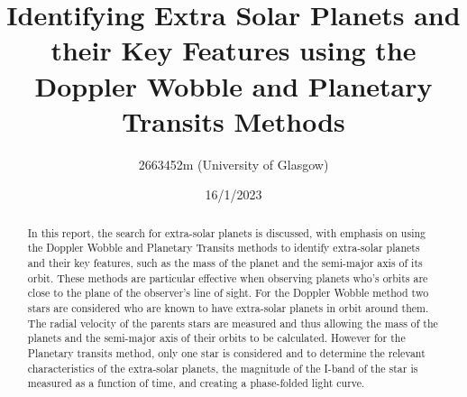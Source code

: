 \documentclass[]{article}
\title{\textbf{Identifying Extra Solar Planets and their Key Features using 
the Doppler Wobble and Planetary Transits Methods}}
\author{2663452m (University of Glasgow)}
\date{16/1/2023}
\begin{document}
\maketitle

\begin{abstract}
In this report, the search for extra-solar planets is discussed,
with emphasis on using the Doppler Wobble and Planetary Transits 
methods to identify extra-solar planets and their key features, 
such as the mass of the planet and the semi-major axis of its orbit.
These methods are particular effective when observing planets who's orbits 
are close to the plane of the observer's line of sight. For the Doppler 
Wobble method two stars are considered who are known to have
extra-solar planets in orbit around them. The radial velocity of 
the parents stars are measured and thus allowing the mass of the 
planets and the semi-major axis of their orbits to be calculated.
However for the Planetary transits method, only one star is considered
and to determine the relevant characteristics of the extra-solar planets,
the magnitude of the I-band of the star is measured as a function
of time, and creating a phase-folded light curve.
  



\end{abstract}
\newpage



\twocolumn
\end{document}
